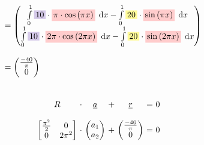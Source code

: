 \documentclass[
final,
a4paper,
oneside,
parskip=full,
headings=standardclasses,
headings=big,
pointednumbers,
fleqn
]{scrartcl}
\newcommand{\tfilly}[1]{\tfillc[#1][yellow!40]}
\newcommand{\tfillr}[1]{\tfillc[#1][red!20]}
\newcommand{\tfillv}[1]{\tfillc[#1][Violet!20]}
\newcommand*\difx{\; \mathop{}\!\mathrm{d}x}
\newcommand{\f}[2]{\frac{#1}{#2}}
\newcommand{\kl}[1]{{\left( #1 \right)}}
\begin{document}
{\begin{align*}
\begin{array}{ll}
            & \\
            & = \begin{pmatrix}
                \int\limits_{0}^{1}{\tfillv{$10$}       \cdot \tfillr{$\pi \cdot \cos\kl{\pi x}$} \difx} -
                \int\limits_{0}^{1}{\tfilly{$20$}      \cdot \tfillr{$\sin\kl{\pi x}$} \difx} \\
                \int\limits_{0}^{1}{\tfillv{$10$}       \cdot \tfillr{$2 \pi \cdot \cos\kl{2 \pi x}$} \difx} -
                \int\limits_{0}^{1}{\tfilly{$20$}      \cdot \tfillr{$\sin\kl{2 \pi x}$} \difx}
            \end{pmatrix} \\
            & \\
            & = \begin{pmatrix}
                \f{-40}{\pi} \\
                0
            \end{pmatrix}
        \end{array}
    \end{align*}} \\
    {\setlength{\abovedisplayskip}{6pt}
    \setlength{\belowdisplayskip}{-12pt}
    \begin{align*}
        \begin{array}{c@{\ }c@{\ }c@{\ }c@{\ }c@{\ }c@{\ }l}
            R & \cdot & \uline{a} & + & \uline{r} & = & 0 \\
            \\
            \begin{bmatrix}
                \f{\pi^2}{2} & 0 \\
                0             & 2\pi^2
            \end{bmatrix} & \cdot &
            \begin{pmatrix}
                a_1 \\
                a_2
            \end{pmatrix} & + &
            \begin{pmatrix}
                \f{-40}{\pi} \\
                0
            \end{pmatrix} & = & 0
            \\
        \end{array}
    \end{align*}} \\
\end{document}
